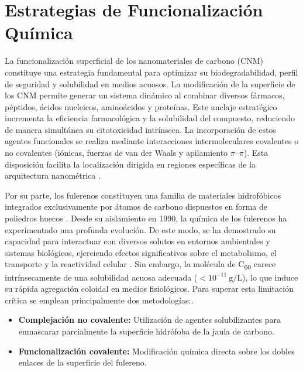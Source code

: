 \section{Estrategias de Funcionalización Química}

La funcionalización superficial de los nanomateriales de carbono (CNM) constituye una estrategia fundamental para optimizar su biodegradabilidad, perfil de seguridad y solubilidad en medios acuosos. La modificación de la superficie de los CNM permite generar un sistema dinámico al combinar diversos fármacos, péptidos, ácidos nucleicos, aminoácidos y proteínas. Este anclaje estratégico incrementa la eficiencia farmacológica y la solubilidad del compuesto, reduciendo de manera simultánea su citotoxicidad intrínseca. La incorporación de estos agentes funcionales se realiza mediante interacciones intermoleculares covalentes o no covalentes (iónicas, fuerzas de van der Waals y apilamiento $\pi$--$\pi$). Esta disposición facilita la localización dirigida en regiones específicas de la arquitectura nanométrica \cite{gaur2021biomedical}.

Por su parte, los fulerenos constituyen una familia de materiales hidrofóbicos integrados exclusivamente por átomos de carbono dispuestos en forma de poliedros huecos \cite{sharoyko2021biologically}. %
 Desde su aislamiento en 1990, la química de los fulerenos ha experimentado una profunda evolución. De este modo, se ha demostrado su capacidad para interactuar con diversos solutos en entornos ambientales y sistemas biológicos, ejerciendo efectos significativos sobre el metabolismo, el transporte y la reactividad celular \cite{ chang2024recent, bai2024research}. Sin embargo, la molécula de C\textsubscript{60} carece intrínsecamente de una solubilidad acuosa adecuada ($< 10^{-11}\ \text{g/L}$), lo que induce su rápida agregación coloidal en medios fisiológicos. Para superar esta limitación crítica se emplean principalmente dos metodologías:\cite{sosnowska2019mechano}.

\begin{itemize}
    \item \textbf{Complejación no covalente:} Utilización de agentes solubilizantes para enmascarar parcialmente la superficie hidrófoba de la jaula de carbono.
    \item \textbf{Funcionalización covalente:} Modificación química directa sobre los dobles enlaces de la superficie del fulereno.
\end{itemize}

